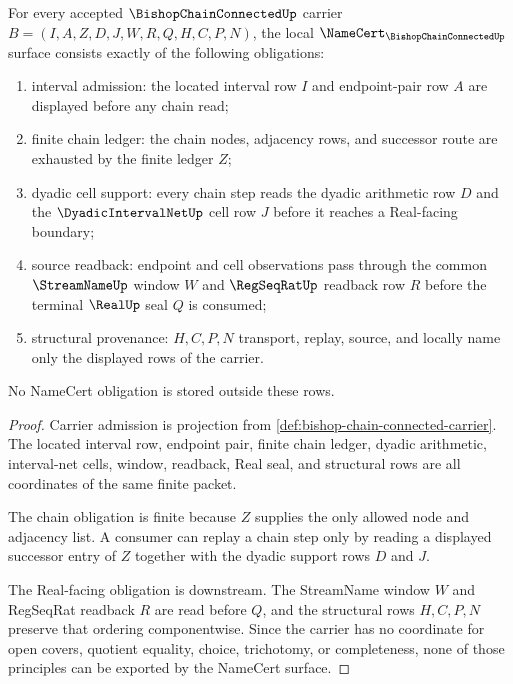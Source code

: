 \begin{theorem}
\label{thm:bishop-chain-connected-namecert-obligations}
For every accepted $\BishopChainConnectedUp$ carrier $B=(I,A,Z,D,J,W,R,Q,H,C,P,N)$, the local $\NameCert_{\BishopChainConnectedUp}$ surface consists exactly of the following obligations:
\begin{enumerate}
\item interval admission: the located interval row $I$ and endpoint-pair row $A$ are displayed before any chain read;
\item finite chain ledger: the chain nodes, adjacency rows, and successor route are exhausted by the finite ledger $Z$;
\item dyadic cell support: every chain step reads the dyadic arithmetic row $D$ and the $\DyadicIntervalNetUp$ cell row $J$ before it reaches a Real-facing boundary;
\item source readback: endpoint and cell observations pass through the common $\StreamNameUp$ window $W$ and $\RegSeqRatUp$ readback row $R$ before the terminal $\RealUp$ seal $Q$ is consumed;
\item structural provenance: $H,C,P,N$ transport, replay, source, and locally name only the displayed rows of the carrier.
\end{enumerate}
No NameCert obligation is stored outside these rows.
\end{theorem}
\begin{proof}
Carrier admission is projection from \autoref{def:bishop-chain-connected-carrier}. The located interval row, endpoint pair, finite chain ledger, dyadic arithmetic, interval-net cells, window, readback, Real seal, and structural rows are all coordinates of the same finite packet.

The chain obligation is finite because $Z$ supplies the only allowed node and adjacency list. A consumer can replay a chain step only by reading a displayed successor entry of $Z$ together with the dyadic support rows $D$ and $J$.

The Real-facing obligation is downstream. The StreamName window $W$ and RegSeqRat readback $R$ are read before $Q$, and the structural rows $H,C,P,N$ preserve that ordering componentwise. Since the carrier has no coordinate for open covers, quotient equality, choice, trichotomy, or completeness, none of those principles can be exported by the NameCert surface.
\end{proof}

